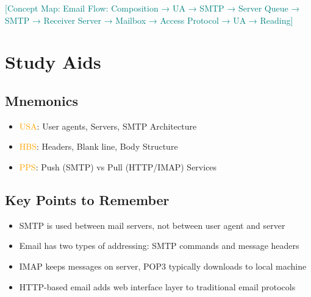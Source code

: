 \documentclass[12pt]{article}
\begin{document}
\textcolor{teal}{[Concept Map: Email Flow: Composition → UA → SMTP → Server Queue → SMTP → Receiver Server → Mailbox → Access Protocol → UA → Reading]}

\section{Study Aids}

\subsection{Mnemonics}
\begin{itemize}
    \item \textcolor{orange}{USA}: User agents, Servers, SMTP Architecture
    \item \textcolor{orange}{HBS}: Headers, Blank line, Body Structure
    \item \textcolor{orange}{PPS}: Push (SMTP) vs Pull (HTTP/IMAP) Services
\end{itemize}

\subsection{Key Points to Remember}
\begin{itemize}
    \item SMTP is used between mail servers, not between user agent and server
    \item Email has two types of addressing: SMTP commands and message headers
    \item IMAP keeps messages on server, POP3 typically downloads to local machine
    \item HTTP-based email adds web interface layer to traditional email protocols
\end{itemize}
\end{document}
